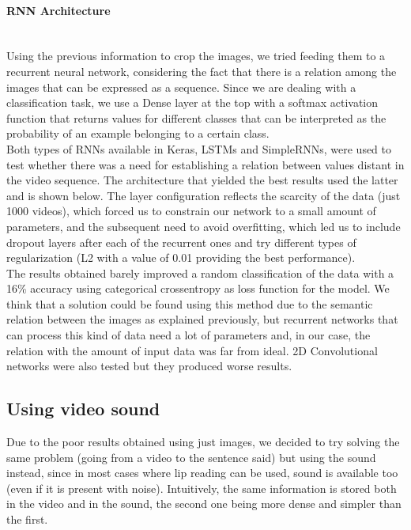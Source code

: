 \documentclass{article}[10pt]
\begin{document}
\begin{multicols}{2}
\paragraph{RNN Architecture} ~\\

Using the previous information to crop the images, we tried feeding them to a
recurrent neural network, considering the fact that there is a relation among the
images that can be expressed as a sequence.  Since we are dealing with a
classification task, we use a Dense layer at the top with a softmax activation
function that returns values for different classes that can be interpreted
as the probability of an example belonging to a certain class.\\

Both types of RNNs available in Keras, LSTMs and SimpleRNNs, were used to test
whether there was a need for establishing a relation between values distant in
the video sequence. The architecture that yielded the best results used the
latter and is shown below. The layer configuration reflects the scarcity of
the data (just 1000 videos), which forced us to constrain our network to a small
amount of parameters, and the subsequent need to avoid overfitting, which led us
to include dropout layers after each of the recurrent ones and try different
types of regularization (L2 with a value of 0.01 providing the best
performance).\\


The results obtained barely improved a random classification of the data with a
16\% accuracy using categorical crossentropy as loss function for the model. We
think that a solution could be found using this method due to the semantic
relation between the images as explained previously, but recurrent networks that
can process this kind of data need a lot of parameters and, in our case, the
relation with the amount of input data was far from ideal. 2D Convolutional
networks were also tested but they produced worse results.

\subsection{Using video sound}

Due to the poor results obtained using just images, we decided to try solving
the same problem (going from a video to the sentence said) but using the sound
instead, since in most cases where lip reading can be used, sound is available
too (even if it is present with noise). Intuitively, the same information is
stored both in the video and in the sound, the second one being more dense and
simpler than the first.


\end{multicols}
\end{document}
